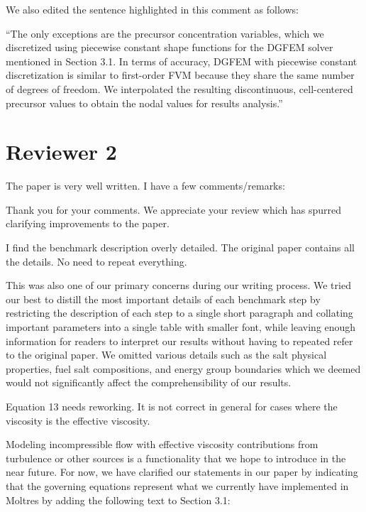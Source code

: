 \documentclass[answers,12pt]{exam}
\begin{document}
\begin{questions}
\begin{solution}
        	We also edited the sentence highlighted in this comment
        	as follows:
        	
        	``The only exceptions are the precursor concentration variables,
which we discretized using piecewise constant shape functions for the 
\gls{DGFEM} solver mentioned in Section 3.1. In terms of accuracy, \gls{DGFEM}
with piecewise constant discretization is similar to first-order \gls{FVM}
because they share the same
number of degrees of freedom. We interpolated the resulting discontinuous,
cell-centered precursor values to obtain the nodal values for results
analysis.''
        \end{solution}


\section*{Reviewer 2}

        \question The paper is very well written. I have a few
        comments/remarks:
        \begin{solution}
            Thank you for your comments. We appreciate your review which has
            spurred clarifying improvements to the paper.
        \end{solution}
        \question I find the benchmark description overly detailed. The
        original paper contains all the details. No need to repeat everything.
        \begin{solution}
        	This was also one of our primary concerns during our writing
        	process. We tried our best to distill the most important details
        	of each benchmark step by restricting the description of each step
        	to a single short paragraph and collating important parameters into
        	a single table with smaller font, while leaving enough information
        	for readers to interpret our results without having to repeated
        	refer to the original paper. We omitted various details such
        	as the salt physical properties, fuel salt compositions, and energy
        	group boundaries which we deemed would not significantly affect
        	the comprehensibility of our results.
        \end{solution}

        \question Equation 13 needs reworking. It is not correct in general for
        cases where the viscosity is the effective viscosity.
        \begin{solution}
        	Modeling incompressible flow with
        	effective viscosity contributions from turbulence or other sources
        	is a functionality that we hope
        	to introduce in the near future. For now, we have clarified our
        	statements in our paper by indicating that the governing equations
        	represent what we currently have implemented in Moltres by adding
        	the following text to Section 3.1:
        	

\end{solution}
\end{questions}
\end{document}
